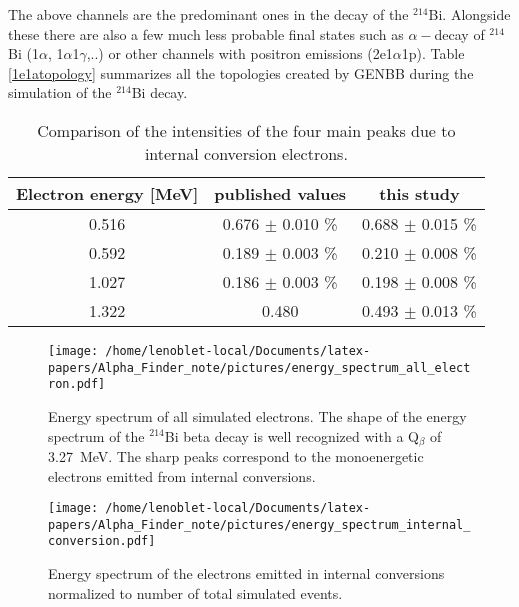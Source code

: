 \documentclass[main.tex]{subfiles}
\begin{document}
\bigskip


\noindent The above channels are the predominant ones in the decay of the $^{\text{214}}$Bi. Alongside these there are also a few much less probable final states such as $\alpha-$decay of $^{\text{214}}$Bi (1$\alpha$, 1$\alpha$1$\gamma$,..) or other channels with positron emissions (2e1$\alpha$1p). Table \ref{1e1atopology} summarizes all the topologies created by GENBB during the simulation of the $^{\text{214}}$Bi decay.


\begin{table}[h!]
\begin{center}
\begin{tabular}{c|c|c}
Electron energy [MeV]  & published values & this study \\[0.1cm]
\toprule
0.516  & 0.676 $\pm$ 0.010 \% & 0.688 $\pm$ 0.015 \% \\[0.1cm]
0.592  & 0.189 $\pm$ 0.003 \% & 0.210 $\pm$ 0.008 \% \\[0.1cm]
1.027  & 0.186 $\pm$ 0.003 \% & 0.198 $\pm$ 0.008 \% \\[0.1cm]            
1.322  & 0.480  & 0.493 $\pm$ 0.013 \% \\[0.1cm]
\bottomrule
\end{tabular}
\end{center}
\caption{Comparison of the intensities of the four main peaks due to internal conversion electrons.}
\label{internalconversioncomparaison}
\end{table}


\begin{figure}[h!]
\begin{center}
\texttt{[image: /home/lenoblet-local/Documents/latex-papers/Alpha\_Finder\_note/pictures/energy\_spectrum\_all\_electron.pdf]}
\caption{Energy spectrum of all simulated electrons. The shape of the energy spectrum of the $^{214}$Bi beta decay is well recognized with a Q$_\beta$ of 3.27~MeV. The sharp peaks correspond to the monoenergetic electrons  emitted from internal conversions.}
\label{energyspectrumallelectron}
\end{center}
\end{figure}


\begin{figure}[h!]
\begin{center}
\texttt{[image: /home/lenoblet-local/Documents/latex-papers/Alpha\_Finder\_note/pictures/energy\_spectrum\_internal\_conversion.pdf]}
\caption{Energy spectrum of the electrons emitted in internal conversions normalized to number of total simulated events.}
\label{energyspectruminternalconversion}
\end{center}
\end{figure}
\end{document}
